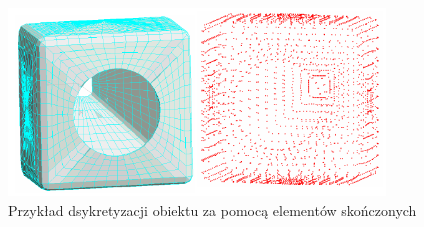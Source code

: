 \vspace{5 mm}

\begin{figure}[h]
\centering
\includegraphics[width=10cm]{Zdjecia/3/MES_przyklad}
\caption{Przykład dsykretyzacji obiektu za pomocą elementów skończonych \cite{bartek_srodka}}
\label{fig:MES_przyklad}
\end{figure}





















